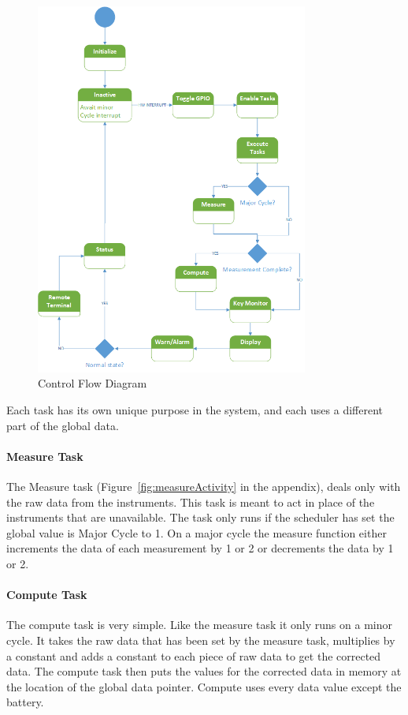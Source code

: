 \documentclass[12pt]{article} %
\begin{document}
\begin{figure}[h]
    \centering
    \includegraphics[width=0.8\textwidth]{../design/Control_state_diagram.png}
    \caption{Control Flow Diagram}
    \label{fig:Control}
\end{figure}

Each task has its own unique purpose in the system, and each uses a different
part of the global data.

\paragraph{Measure Task}
The Measure task (Figure~\ref{fig:measureActivity} in the
appendix), deals only with the raw data from the instruments. This task is
meant to act in place of the instruments that are unavailable. The task only
runs if the scheduler has set the global value is Major Cycle to 1. On a major
cycle the measure function either increments the data of each measurement by 1
or 2 or decrements the data by 1 or 2.

\paragraph{Compute Task}
The compute task is very simple. Like the measure task it only runs on a minor
cycle. It takes the raw data that has been set by the measure task, multiplies
by a constant and adds a constant to each piece of raw data to get the
corrected data. The compute task then puts the values for the corrected data in
memory at the location of the global data pointer. Compute uses every data
value except the battery.
\end{document}
